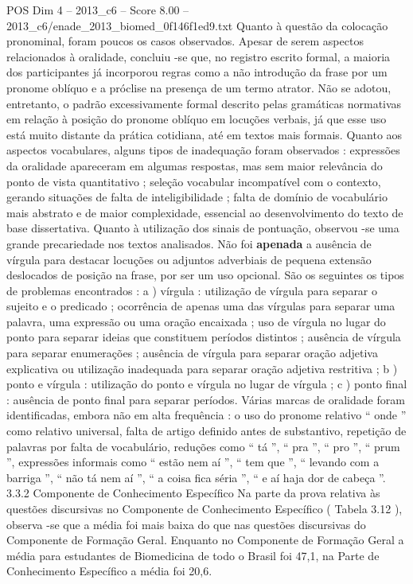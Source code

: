 \begin{textsample}{POS Dim 4 – 2013\_c6 – Score 8.00 – 2013\_c6/enade\_2013\_biomed\_0f146f1ed9.txt}
Quanto à questão da colocação pronominal, foram poucos os casos observados.
Apesar de serem aspectos relacionados à oralidade, concluiu -se que, no registro escrito formal, a maioria dos participantes já incorporou regras como a não introdução da frase por um pronome oblíquo e a próclise na presença de um termo atrator.
Não se adotou, entretanto, o padrão excessivamente formal descrito pelas gramáticas normativas em relação à posição do pronome oblíquo em locuções verbais, já que esse uso está muito distante da prática cotidiana, até em textos mais formais.
Quanto aos aspectos vocabulares, alguns tipos de inadequação foram observados : expressões da oralidade apareceram em algumas respostas, mas sem maior relevância do ponto de vista quantitativo ; seleção vocabular incompatível com o contexto, gerando situações de falta de inteligibilidade ; falta de domínio de vocabulário mais abstrato e de maior complexidade, essencial ao desenvolvimento do texto de base dissertativa.
Quanto à utilização dos sinais de pontuação, observou -se uma grande precariedade nos textos analisados.
Não foi \textbf{apenada} a ausência de vírgula para destacar locuções ou adjuntos adverbiais de pequena extensão deslocados de posição na frase, por ser um uso opcional.
São os seguintes os tipos de problemas encontrados : a ) vírgula : utilização de vírgula para separar o sujeito e o predicado ; ocorrência de apenas uma das vírgulas para separar uma palavra, uma expressão ou uma oração encaixada ; uso de vírgula no lugar do ponto para separar ideias que constituem períodos distintos ; ausência de vírgula para separar enumerações ; ausência de vírgula para separar oração adjetiva explicativa ou utilização inadequada para separar oração adjetiva restritiva ; b ) ponto e vírgula : utilização do ponto e vírgula no lugar de vírgula ; c ) ponto final : ausência de ponto final para separar períodos.
Várias marcas de oralidade foram identificadas, embora não em alta frequência : o uso do pronome relativo “ onde ” como relativo universal, falta de artigo definido antes de substantivo, repetição de palavras por falta de vocabulário, reduções como “ tá ”, “ pra ”, “ pro ”, “ prum ”, expressões informais como “ estão nem aí ”, “ tem que ”, “ levando com a barriga ”, “ não tá nem aí ”, “ a coisa fica séria ”, “ e aí haja dor de cabeça ”. 3.3.2 Componente de Conhecimento Específico Na parte da prova relativa às questões discursivas no Componente de Conhecimento Específico ( Tabela 3.12 ), observa -se que a média foi mais baixa do que nas questões discursivas do Componente de Formação Geral.
Enquanto no Componente de Formação Geral a média para estudantes de Biomedicina de todo o Brasil foi 47,1, na Parte de Conhecimento Específico a média foi 20,6.

\end{textsample}
